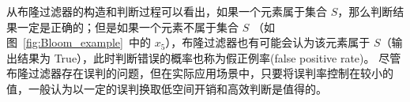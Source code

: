 


从布隆过滤器的构造和判断过程可以看出，如果一个元素属于集合 $S$，那么判断结果一定是正确的；但是如果一个元素不属于集合 $S$ （如图~\ref{fig:Bloom_example}~中的 $x_5$），布隆过滤器也有可能会认为该元素属于 $S$（输出结果为 True），此时判断错误的概率也称为假正例率(false positive rate)。
尽管布隆过滤器存在误判的问题，但在实际应用场景中，只要将误判率控制在较小的值，一般认为以一定的误判换取低空间开销和高效判断是值得的。

